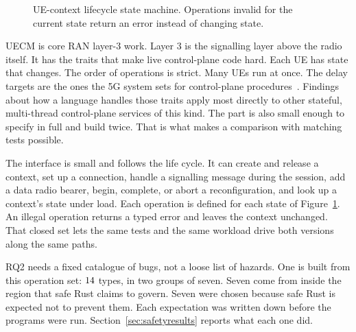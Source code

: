 \documentclass[english,oneside,a4paper,censored,csm,software-track-2020]{HYthesisML}
\begin{document}
\begin{figure}[ht]
\centering
{}
\caption[UE-context lifecycle state machine]{UE-context lifecycle state machine.
Operations invalid for the current state return an error instead of changing
state.\label{fig:fsm}}
\end{figure}

UECM is core RAN layer-3 work. Layer 3 is the signalling layer above the radio itself.
It has the traits that make live control-plane code hard.
Each UE has state that changes. The order of operations is strict. Many UEs run at once.
The delay targets are the ones the 5G system sets for control-plane procedures~\cite{3gpp38913,3gpp22261}.
Findings about how a language handles those traits apply most directly to other stateful, multi-thread control-plane services of this kind.
The part is also small enough to specify in full and build twice.
That is what makes a comparison with matching tests possible.

The interface is small and follows the life cycle.
It can create and release a context, set up a connection, handle a signalling message during the session, add a data radio bearer, begin, complete, or abort a reconfiguration, and look up a context's state under load.
Each operation is defined for each state of Figure~\ref{fig:fsm}.
An illegal operation returns a typed error and leaves the context unchanged.
That closed set lets the same tests and the same workload drive both versions along the same paths.

RQ2 needs a fixed catalogue of bugs, not a loose list of hazards.
One is built from this operation set: $14$ types, in two groups of seven.
Seven come from inside the region that safe Rust claims to govern.
Seven were chosen because safe Rust is expected not to prevent them.
Each expectation was written down before the programs were run.
Section~\ref{sec:safetyresults} reports what each one did.
\end{document}
